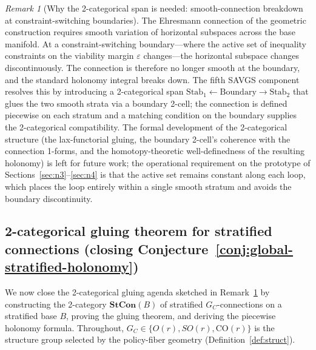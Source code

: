 \documentclass[11pt,a4paper]{article}
\theoremstyle{plain}
\theoremstyle{definition}
\theoremstyle{remark}
\newtheorem{remark}[theorem]{Remark}
\newcommand{\CO}{\mathrm{CO}}
\newcommand{\Stab}{\mathrm{Stab}}
\begin{document}
\begin{remark}[Why the 2-categorical span is needed: smooth-connection
breakdown at constraint-switching boundaries]
\label{rem:2cat-span}
The Ehresmann connection of the geometric construction requires
smooth variation of horizontal subspaces across the base manifold.
At a constraint-switching boundary---where the active set of
inequality constraints on the viability margin $\varepsilon$
changes---the horizontal subspace changes discontinuously. The
connection is therefore no longer smooth at the boundary, and the
standard holonomy integral breaks down. The fifth SAVGS component
resolves this by introducing a 2-categorical span
$\Stab_1\leftarrow\mathrm{Boundary}\rightarrow\Stab_2$ that glues the
two smooth strata via a boundary 2-cell; the connection is defined
piecewise on each stratum and a matching condition on the boundary
supplies the 2-categorical compatibility. The formal development of
the 2-categorical structure (the lax-functorial gluing, the boundary
2-cell's coherence with the connection 1-forms, and the
homotopy-theoretic well-definedness of the resulting holonomy) is
left for future work; the operational requirement on the prototype
of Sections~\ref{sec:n3}--\ref{sec:n4} is that the active set
remains constant along each loop, which places the loop entirely
within a single smooth stratum and avoids the boundary discontinuity.
\end{remark}

\subsection{2-categorical gluing theorem for stratified connections
(closing Conjecture~\ref{conj:global-stratified-holonomy})}
\label{sec:2cat-gluing}

We now close the 2-categorical gluing agenda sketched in
Remark~\ref{rem:2cat-span} by constructing the 2-category
$\mathbf{StCon}(B)$ of stratified $G_C$-connections on a stratified base
$B$, proving the gluing theorem, and deriving the piecewise holonomy
formula. Throughout, $G_C \in \{O(r), SO(r), \CO(r)\}$ is the structure
group selected by the policy-fiber geometry (Definition~\ref{def:struct}).
\end{document}
